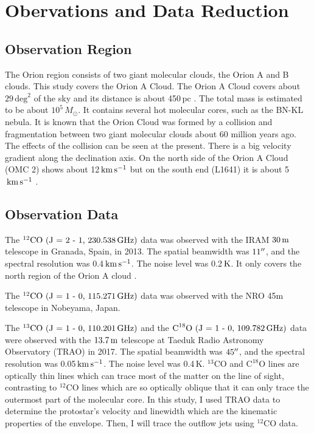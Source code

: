 \section{Obervations and Data Reduction}

\subsection{Observation Region}
The Orion region consists of two giant molecular clouds, the Orion A and B clouds. This study covers the Orion A Cloud. The Orion A Cloud covers about $29 \, \textrm{deg}^2$ of the sky and its distance is about 450$\,$pc \cite{kounkel2017gould}. The total mass is estimated to be about $10^5 \, M_{\odot}$. It contains several hot molecular cores, such as the BN-KL nebula. It is known that the Orion Cloud was formed by a collision and fragmentation between two giant molecular clouds about 60 million years ago. The effects of the collision can be seen at the present. There is a big velocity gradient along the declination axis. On the north side of the Orion A Cloud (OMC 2) shows about 12$\, \rm km\,s^{-1}$ but on the south end (L1641) it is about 5$\, \rm km\,s^{-1}$ \cite{schulz2012formation}.

\subsection{Observation Data}
The $^{12}\textrm{CO (J = 2 - 1, 230.538\,GHz)}$ data was observed with the IRAM $\textrm{30\,m}$ telescope in Granada, Spain, in 2013. The spatial beamwidth was $\textrm 11^{\prime\prime}$, and the spectral resolution was 0.4$\, \rm km\,s^{-1}$. The noise level was 0.2$\, \rm K$. It only covers the north region of the Orion A cloud \cite{berne2014iram}.

The $^{12}\textrm{CO (J = 1 - 0, 115.271\,GHz})$ data was observed with the NRO 45m telescope in Nobeyama, Japan.

The $^{13}\textrm{CO (J = 1 - 0, 110.201\,GHz})$ and the $\textrm{C}^{18}\textrm{O (J = 1 - 0, 109.782\,GHz})$ data were observed with the $\textrm{13.7\,m}$ telescope at Taeduk Radio Astronomy Observatory (TRAO) in 2017. The spatial beamwidth was $\textrm 45^{\prime\prime}$, and the spectral resolution was 0.05$\, \rm km\,s^{-1}$. The noise level was 0.4$\,$K.
$^{13}\textrm{CO}$ and $\textrm{C}^{18}\textrm{O}$ lines are optically thin lines which can trace most of the matter on the line of sight, contrasting to $^{12}\textrm{CO}$ lines which are so optically oblique that it can only trace the outermost part of the molecular core. In this study, I used TRAO data to determine the protostar's velocity and linewidth which are the kinematic properties of the envelope. Then, I will trace the outflow jets using $^{12}$CO data.

